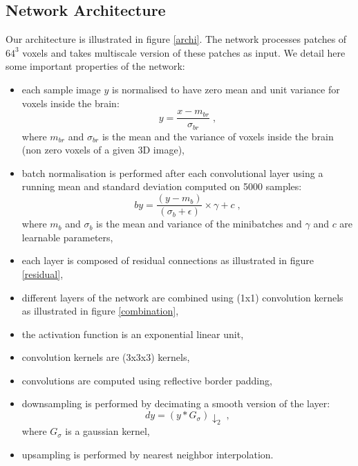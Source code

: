 \documentclass[11pt]{article}
\begin{document}
\subsection{Network Architecture}

Our architecture is illustrated in figure \ref{archi}. The network processes patches of $64^3$ voxels and takes multiscale version of these patches as input. We detail here some important properties of the network:

\begin{itemize}

\item each sample image $y$ is normalised to have zero mean and unit variance for voxels inside the brain:
\begin{equation}
y = \frac{x-m_{br} }{\sigma_{br} } \; ,
\end{equation}
where $m_{br}$ and $\sigma_{br}$ is the mean and the variance of voxels inside the brain (non zero voxels of a given 3D image),

\item batch normalisation is performed after each convolutional layer using a running mean and standard deviation computed on 5000 samples:
\begin{equation}
by = \frac{ (y-m_b) }{( \sigma_b + \epsilon) } \times \gamma + c \; ,
\end{equation}
where $m_{b}$ and $\sigma_{b}$ is the mean and variance of the minibatches and $\gamma$ and $c$ are learnable parameters,

\item each layer is composed of residual connections as illustrated in figure \ref{residual},

\item different layers of the network are combined using (1x1) convolution kernels as illustrated in figure \ref{combination},

\item the activation function is an exponential linear unit,

\item convolution kernels are (3x3x3) kernels,

\item convolutions are computed using reflective border padding,

\item downsampling is performed by decimating a smooth version of the layer:
\begin{equation}
dy = (y  \ast G_\sigma) \downarrow_2 \; ,
\end{equation}
where $G_\sigma$ is a gaussian kernel,

\item upsampling is performed by nearest neighbor interpolation.

\end{itemize}
\end{document}
